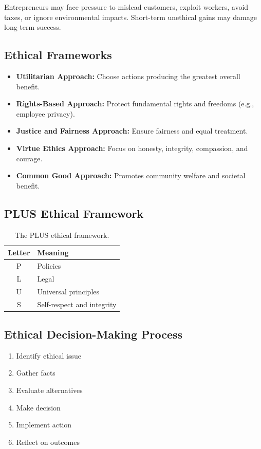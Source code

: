 \documentclass[12pt,a4paper]{article}
\begin{document}
Entrepreneurs may face pressure to mislead customers, exploit workers, avoid taxes, or ignore environmental impacts. Short-term unethical gains may damage long-term success.

\subsection*{Ethical Frameworks}

\begin{itemize}
    \item \textbf{Utilitarian Approach:} Choose actions producing the greatest overall benefit.
    \item \textbf{Rights-Based Approach:} Protect fundamental rights and freedoms (e.g., employee privacy).
    \item \textbf{Justice and Fairness Approach:} Ensure fairness and equal treatment.
    \item \textbf{Virtue Ethics Approach:} Focus on honesty, integrity, compassion, and courage.
    \item \textbf{Common Good Approach:} Promotes community welfare and societal benefit.
\end{itemize}

\subsection*{PLUS Ethical Framework}
\begin{table}[h!]
\centering
\begin{tabular}{|c|l|}
\hline
\textbf{Letter} & \textbf{Meaning} \\ \hline
P & Policies \\ \hline
L & Legal \\ \hline
U & Universal principles \\ \hline
S & Self-respect and integrity \\ \hline
\end{tabular}
\caption{The PLUS ethical framework.}
\end{table}

\subsection*{Ethical Decision-Making Process}
\begin{enumerate}
    \item Identify ethical issue
    \item Gather facts
    \item Evaluate alternatives
    \item Make decision
    \item Implement action
    \item Reflect on outcomes
\end{enumerate}
\end{document}
